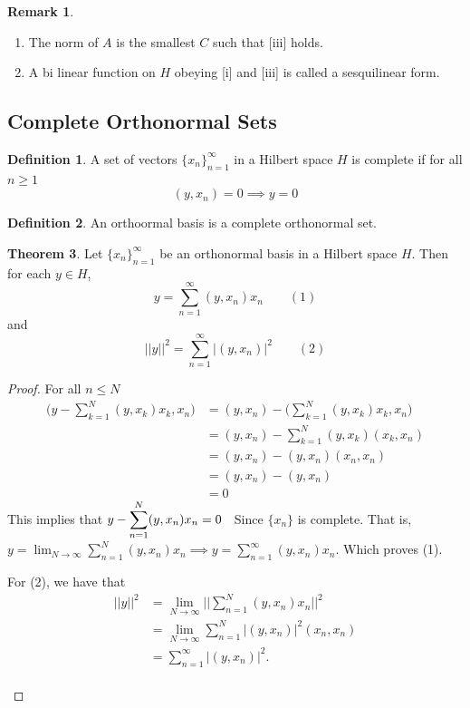 \documentclass[11pt,a4paper]{article}
\theoremstyle{definition}
\newtheorem{thm}{Theorem}[section]
\newtheorem{defn}[thm]{Definition}
\newtheorem*{remark}{Remark}
\begin{document}
\begin{remark}
\begin{enumerate}
\item The norm of $A$ is the smallest $C$ such that [iii] holds.
\item A bi linear function on $H$ obeying [i] and [iii] is called a sesquilinear form.
\end{enumerate}


\end{remark}


\subsection{Complete Orthonormal Sets}

\begin{defn}
A set of vectors $\{x_n\}^{\infty}_{n=1}$ in a Hilbert space $H$ is complete if for all $n\geq 1$ $$(y,x_n)=0\implies y=0$$
\end{defn}


\begin{defn}
An orthoormal basis is a complete orthonormal set.

\end{defn}

\begin{thm}
Let $\{x_n\}^{\infty}_{n=1}$ be an orthonormal basis in a Hilbert space $H$. Then for each $y\in H$, $$y=\sum^{\infty}_{n=1}(y,x_n)x_n\qquad (1)$$ and $$||y||^2=\sum^{\infty}_{n=1}|(y,x_n)|^2\qquad (2)$$
\end{thm}


\begin{proof}
For all $n\leq N$
\begin{align*}
\Bigg(y-\sum^N_{k=1}(y,x_k)x_k,x_n\Bigg) &=(y,x_n)-\Bigg(\sum^{N}_{k=1}(y,x_k)x_k,x_n\Bigg)\\
                                         &=(y,x_n)-\sum^N_{k=1}(y,x_k)(x_k,x_n)\\
                                         &=(y,x_n)-(y,x_n)(x_n,x_n)\\
                                         &=(y,x_n)-(y,x_n)\\
                                         &=0
\end{align*}
This implies that \hspace{0.2cm}$\displaystyle{y-\sum^N_{n=1}(y,x_n)x_n=0}\hspace{0.2cm}$ Since $\{x_n\}$ is complete. That is,\\$\displaystyle{y=\lim_{N\rightarrow \infty}\sum^N_{n=1}(y,x_n)x_n\implies y=\sum^{\infty}_{n=1}(y,x_n)x_n}.$ Which proves (1).

For (2), we have that 
\begin{align*}
||y||^2 &=\lim_{N\rightarrow \infty}\Bigg|\Bigg|\sum^N_{n=1}(y,x_n)x_n\Bigg|\Bigg|^2\\
        &=\lim_{N\rightarrow \infty}\sum^N_{n=1}|(y,x_n)|^2(x_n,x_n)\\
        &=\sum^{\infty}_{n=1}|(y,x_n)|^2.\\\\\\
\end{align*}
\end{proof}
\end{document}
